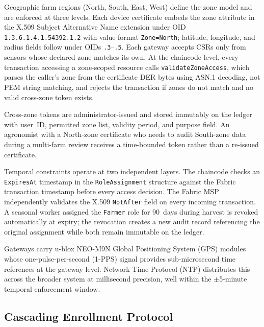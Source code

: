 \documentclass[a4paper,fleqn]{cas-dc}
\begin{document}
Geographic farm regions (North, South, East, West) define the zone model
and are enforced at three levels. Each device certificate embeds the
zone attribute in the X.509 Subject Alternative Name extension under
OID \texttt{1.3.6.1.4.1.54392.1.2} with value format \texttt{Zone=North};
latitude, longitude, and radius fields follow under OIDs
\texttt{.3}--\texttt{.5}. Each gateway accepts CSRs only from sensors
whose declared zone matches its own. At the chaincode level, every
transaction accessing a zone-scoped resource calls
\texttt{validateZoneAccess}, which parses the caller's zone from the
certificate DER bytes using ASN.1 decoding, not PEM string
matching, and rejects the transaction if zones do not match and no
valid cross-zone token exists.

Cross-zone tokens are administrator-issued and stored immutably on the
ledger with user~ID, permitted zone list, validity period, and purpose
field. An agronomist with a North-zone certificate who needs to audit
South-zone data during a multi-farm review receives a time-bounded
token rather than a re-issued certificate.

Temporal constraints operate at two independent layers. The chaincode
checks an \texttt{ExpiresAt} timestamp in the \texttt{RoleAssignment}
structure against the Fabric transaction timestamp before every access
decision. The Fabric MSP independently validates the X.509
\texttt{NotAfter} field on every incoming transaction. A seasonal worker
assigned the \texttt{Farmer} role for 90~days during harvest is revoked
automatically at expiry; the revocation creates a new audit record
referencing the original assignment while both remain immutable on the
ledger.

Gateways carry u-blox NEO-M9N Global Positioning System (GPS) modules
whose one-pulse-per-second (1-PPS) signal provides sub-microsecond time
references at the gateway level. Network Time Protocol (NTP) distributes
this across the broader system at millisecond precision, well within
the $\pm$5-minute temporal enforcement window.

\subsection{Cascading Enrollment Protocol}
\label{subsec:enrollment}
\end{document}
